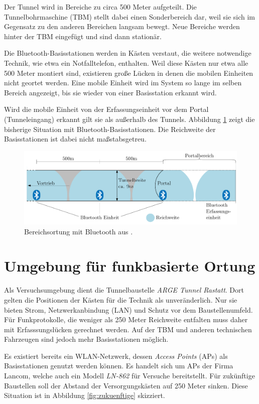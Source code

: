 Der Tunnel wird in Bereiche zu circa 500 Meter aufgeteilt. 
Die Tunnelbohrmaschine (TBM) stellt dabei einen Sonderbereich dar, weil sie sich im Gegensatz zu den anderen Bereichen langsam bewegt. 
Neue Bereiche werden hinter der TBM eingefügt und sind dann stationär.

Die Bluetooth-Basisstationen werden in Kästen verstaut, die weitere notwendige Technik, wie etwa ein Notfalltelefon, enthalten.
Weil diese Kästen nur etwa alle 500 Meter montiert sind, existieren große Lücken in denen die mobilen Einheiten nicht geortet werden.
Eine mobile Einheit wird im System so lange im selben Bereich angezeigt, bis sie wieder von einer Basisstation erkannt wird.

Wird die mobile Einheit von der Erfassungseinheit vor dem Portal (Tunneleingang) erkannt gilt sie als außerhalb des Tunnels.
Abbildung \ref{fig:bisherige} zeigt die bisherige Situation mit Bluetooth-Basisstationen. 
Die Reichweite der Basisstationen ist dabei nicht maßstabsgetreu.

\begin{figure}[h]
  \centering
	\includegraphics[width=\textwidth]{images/bisherige.png}
  \caption{Bereichsortung mit Bluetooth aus \cite{maurer2016unterstuetzung}.}
  \label{fig:bisherige}
\end{figure}

 
\section{Umgebung für funkbasierte Ortung}
Als Versuchsumgebung dient die Tunnelbaustelle \emph{ARGE Tunnel Rastatt}.
Dort gelten die Positionen der Kästen für die Technik als unveränderlich.
Nur sie bieten Strom, Netzwerkanbindung (LAN) und Schutz vor dem Baustellenumfeld.
Für Funkprotokolle, die weniger als 250 Meter Reichweite entfalten muss daher mit Erfasssungslücken gerechnet werden.
Auf der TBM und anderen technischen Fahrzeugen sind jedoch mehr Basisstationen möglich.

Es existiert bereits ein WLAN-Netzwerk, dessen \emph{Access Points} (APs) als Basisstationen genutzt werden können.
Es handelt sich um APs der Firma Lancom, welche auch ein Modell \emph{LN-862} für Versuche bereitstellt.
Für zukünftige Baustellen soll der Abstand der Versorgungskästen auf 250 Meter sinken. 
Diese Situation ist in Abbildung \ref{fig:zukuenftige} skizziert.

